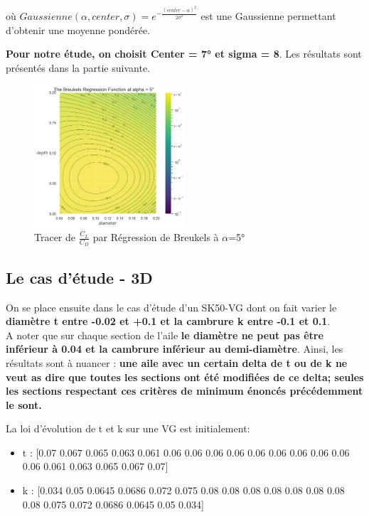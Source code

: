 \documentclass[conference]{IEEEtran}
\begin{document}
    où $Gaussienne(\alpha, center, \sigma) = e^{-\frac{(center - \alpha)^2}{2\sigma^2}}$ est une Gaussienne permettant d'obtenir une moyenne pondérée. 

\textbf{Pour notre étude, on choisit Center = 7° et sigma = 8}. Les résultats sont présentés dans la partie suivante.
\begin{figure}[H]
    \centering
    \includegraphics[width=0.5\textwidth]{Pics/breukels.png}  
    \caption{Tracer de $\frac{C_L}{C_D}$ par Régression de Breukels à $\alpha$=5°}
    \label{fig:breukels}
\end{figure}


\subsection{Le cas d'étude - 3D} 

On se place ensuite dans le cas d'étude d'un SK50-VG dont on fait varier le \textbf{diamètre t entre -0.02 et +0.1 et la cambrure k entre -0.1 et 0.1}. \\
    A noter que sur chaque section de l'aile \textbf{le diamètre ne peut pas être inférieur à 0.04 et la cambrure inférieur au demi-diamètre}. Ainsi, les résultats sont à nuancer : \textbf{une aile avec un certain delta de t ou de k ne veut as dire que toutes les sections ont été modifiées de ce delta; seules les sections respectant ces critères de minimum énoncés précédemment le sont.}

La loi d'évolution de t et k sur une VG est initialement:  
\begin{itemize}
    \item t : [0.07 0.067 0.065 0.063 0.061 0.06 0.06  0.06 0.06 0.06  0.06  0.06 0.06 0.06  0.06 0.061 0.063 0.065 0.067 0.07]
    \item k : [0.034 0.05 0.0645 0.0686 0.072 0.075 0.08 0.08 0.08 0.08      0.08 0.08 0.08 0.08 0.075 0.072 0.0686 0.0645 0.05 0.034]
\end{itemize}
\end{document}
